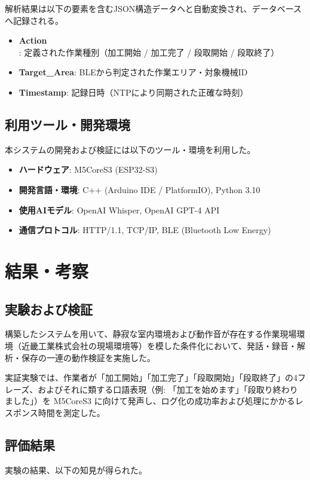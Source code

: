 \documentclass[a4paper,12pt,ja=standard,lualatex]{bxjsarticle}
\begin{document}
解析結果は以下の要素を含むJSON構造データへと自動変換され、データベースへ記録される。
\begin{itemize}
    \item \textbf{Action}: 定義された作業種別（加工開始 / 加工完了 / 段取開始 / 段取終了）
    \item \textbf{Target\_Area}: BLEから判定された作業エリア・対象機械ID
    \item \textbf{Timestamp}: 記録日時（NTPにより同期された正確な時刻）
\end{itemize}

\subsection{利用ツール・開発環境}
本システムの開発および検証には以下のツール・環境を利用した。
\begin{itemize}
    \item \textbf{ハードウェア}: M5CoreS3 (ESP32-S3)
    \item \textbf{開発言語・環境}: C++ (Arduino IDE / PlatformIO), Python 3.10
    \item \textbf{使用AIモデル}: OpenAI Whisper, OpenAI GPT-4 API
    \item \textbf{通信プロトコル}: HTTP/1.1, TCP/IP, BLE (Bluetooth Low Energy)
\end{itemize}

\newpage

\section{結果・考察}\label{sec4}

\subsection{実験および検証}
構築したシステムを用いて、静寂な室内環境および動作音が存在する作業現場環境（近畿工業株式会社の現場環境等）を模した条件化において、発話・録音・解析・保存の一連の動作検証を実施した。

実証実験では、作業者が「加工開始」「加工完了」「段取開始」「段取終了」の4フレーズ、およびそれに類する口語表現（例: 「加工を始めます」「段取り終わりました」）を M5CoreS3 に向けて発声し、ログ化の成功率および処理にかかるレスポンス時間を測定した。

\subsection{評価結果}
実験の結果、以下の知見が得られた。
\end{document}
